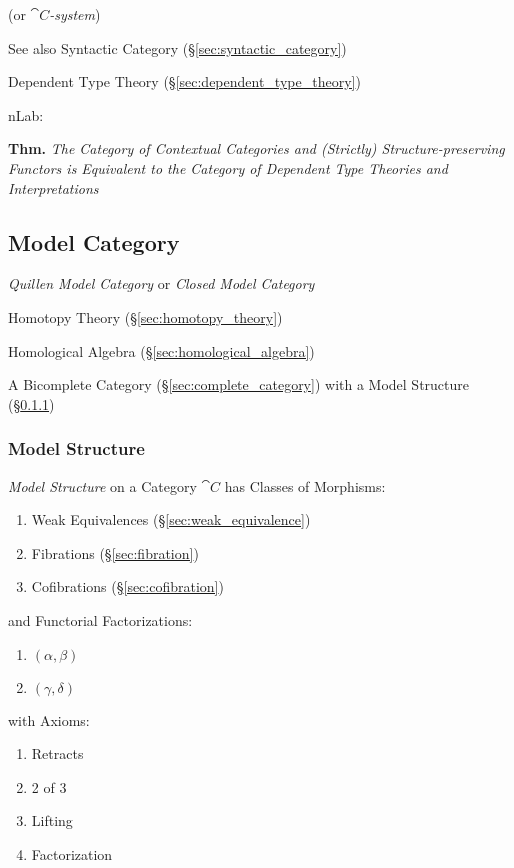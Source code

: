 (or \emph{$\cat{C}$-system})

\fist See also Syntactic Category (\S\ref{sec:syntactic_category})

Dependent Type Theory (\S\ref{sec:dependent_type_theory})

nLab:

\textbf{Thm.} \emph{The Category of Contextual Categories and
  (Strictly) Structure-preserving Functors is Equivalent to the
  Category of Dependent Type Theories and Interpretations} %



\subsection{Model Category}\label{sec:model_category}

\emph{Quillen Model Category} or \emph{Closed Model Category}

Homotopy Theory (\S\ref{sec:homotopy_theory})

Homological Algebra (\S\ref{sec:homological_algebra})

A Bicomplete Category (\S\ref{sec:complete_category}) with a Model
Structure (\S\ref{sec:model_structure})



\subsubsection{Model Structure}\label{sec:model_structure}

\emph{Model Structure} on a Category $\cat{C}$ has Classes of
Morphisms:
\begin{enumerate}
  \item Weak Equivalences (\S\ref{sec:weak_equivalence})
  \item Fibrations (\S\ref{sec:fibration})
  \item Cofibrations (\S\ref{sec:cofibration})
\end{enumerate}
and Functorial Factorizations:
\begin{enumerate}
  \item $(\alpha,\beta)$
  \item $(\gamma,\delta)$
\end{enumerate}
with Axioms:
\begin{enumerate}
  \item Retracts
  \item 2 of 3
  \item Lifting
  \item Factorization
\end{enumerate} %




